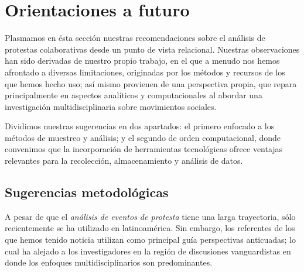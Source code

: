 \documentclass[letterpaper, 11pt]{book}
\theoremstyle{definition}
\theoremstyle{remark}
\begin{document}
\section{Orientaciones a futuro}
\label{sec:TrabajoPosterior}


Plasmamos en ésta sección nuestras recomendaciones sobre el análisis de protestas colaborativas desde un punto de vista relacional. 
Nuestras observaciones han sido derivadas de nuestro propio trabajo, en el que a menudo nos hemos afrontado a diversas limitaciones, originadas por los métodos y recursos de los que hemos hecho uso; así mismo provienen de una perspectiva propia, que repara principalmente en aspectos analíticos y computacionales al abordar una investigación multidisciplinaria sobre movimientos sociales. 

Dividimos nuestras sugerencias en dos apartados: el primero enfocado a los métodos de muestreo y análisis; 
y el segundo de orden computacional, donde convenimos que la incorporación de herramientas tecnológicas ofrece ventajas relevantes para la recolección, almacenamiento y análisis de datos. 






\subsection{Sugerencias metodológicas}
\label{subsec:Posterior_Metodología}

A pesar de que el \emph{análisis de eventos de protesta} tiene una larga trayectoria, sólo recientemente se ha utilizado en latinoamérica. 
Sin embargo, los referentes de los que hemos tenido noticia utilizan como principal guía perspectivas anticuadas; lo cual ha alejado a los investigadores en la región de discusiones vanguardistas en donde los enfoques multidisciplinarios son predominantes. 
\end{document}
